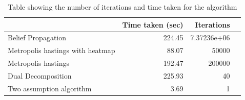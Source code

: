 \documentclass[10pt,oneside,letterpaper]{article}
\begin{document}
\begin{table}
  \begin{tabular}{|l|r|r|r|}
    \hline
                                     & Time taken (sec) & Iterations \\
    \hline
    Belief Propagation               & 224.45           & 7.37236e+06\\
    Metropolis hastings with heatmap & 88.07            & 50000\\
                  Metropolis hastings& 192.47           & 200000\\
    Dual Decomposition               & 225.93           & 40\\
    Two assumption algorithm         & 3.69             & 1\\
    \hline
  \end{tabular}
  \caption{Table showing the number of iterations and time taken for the algorithm}
  \label{tab:convergencetime}
\end{table}





\end{document}
